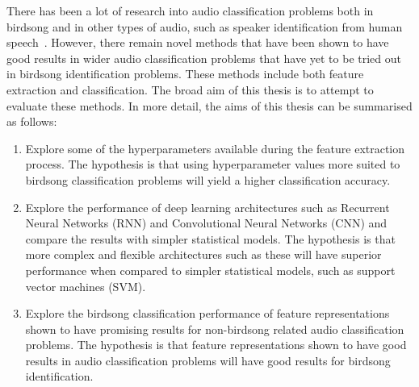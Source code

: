 There has been a lot of research into audio classification problems both in
birdsong and in other types of audio, such as speaker identification from human
speech~\cite{KUDO19991103}. However, there remain novel methods that have been
shown to have good results in wider audio classification problems that have yet
to be tried out in birdsong identification problems. These methods include both
feature extraction and classification. The broad aim of this thesis is to
attempt to evaluate these methods. In more detail, the aims of this thesis can
be summarised as follows:

\begin{enumerate}

  \item Explore some of the hyperparameters available during the feature
    extraction process. The hypothesis is that using hyperparameter values more
    suited to birdsong classification problems will yield a higher classification
    accuracy.

  \item Explore the performance of deep learning architectures such as Recurrent
    Neural Networks (RNN) and Convolutional Neural Networks (CNN) and compare
    the results with simpler statistical models. The hypothesis is that more
    complex and flexible architectures such as these will have superior
    performance when compared to simpler statistical models, such as support
    vector machines (SVM).

  \item Explore the birdsong classification performance of feature
    representations shown to have promising results for non-birdsong related
    audio classification problems. The hypothesis is that feature
    representations shown to have good results in audio classification problems
    will have good results for birdsong identification.

\end{enumerate}
